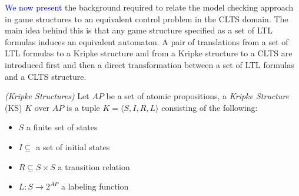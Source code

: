 \textcolor{blue}{We now present} the background required to relate the model checking approach in game structures to an equivalent control problem in the CLTS domain.  The main idea behind this is that any game structure specified as a set of LTL formulas induces an equivalent automaton. A pair of translations from a set of LTL formulas to a Kripke structure and from a Kripke structure to a CLTS are introduced first and then a direct transformation between a set of LTL formulas and a CLTS structure.

\begin{definition}
	\label{def:Kripke} \emph{(Kripke Structures)} 
	Let $AP$ be a set of atomic propositions, a \emph{Kripke Structure} (KS)  $K$ over $AP$ is a tuple $K =  \langle S, I, R, L \rangle$ consisting of the following:
	\begin{itemize}
		\item $S$ a finite set of states
		\item $I \subseteq$ a set of initial states
		\item $R \subseteq S \times S$ a transition relation
		\item $L: S \rightarrow 2^{AP}$ a labeling function
	\end{itemize} 
\end{definition}

